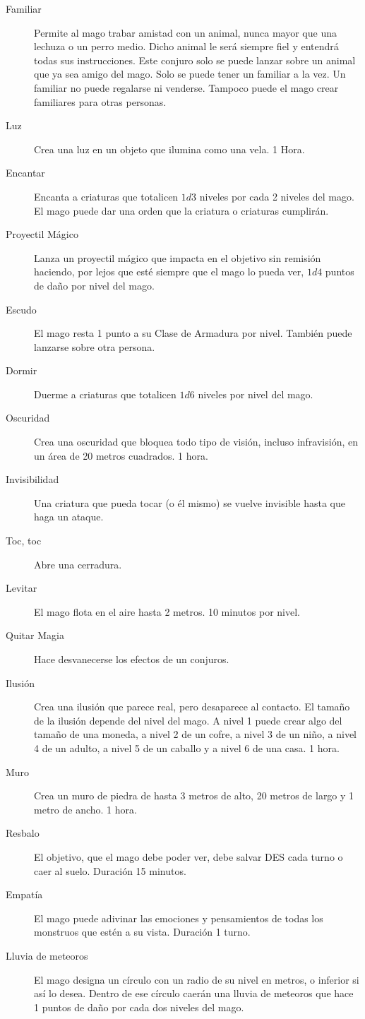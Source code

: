 \begin{multicols}{2}
\begin{description}
\item[Familiar] Permite al mago trabar amistad con un animal, nunca mayor que una lechuza o un perro medio. Dicho animal le será siempre fiel y entendrá todas sus instrucciones. Este conjuro solo se puede lanzar sobre un animal que ya sea amigo del mago. Solo se puede tener un familiar a la vez. Un familiar no puede regalarse ni venderse. Tampoco puede el mago crear familiares para otras personas.
\item[Luz] Crea una luz en un objeto que ilumina como una vela. 1 Hora.
\item[Encantar] Encanta a criaturas que totalicen $1d3$ niveles por cada 2 niveles del mago. El mago puede dar una orden que la criatura o criaturas cumplirán.
\item[Proyectil Mágico] Lanza un proyectil mágico que impacta en el objetivo sin remisión haciendo, por lejos que esté siempre que el mago lo pueda ver, $1d4$ puntos de daño por nivel del mago.
\item[Escudo] El mago resta 1 punto a su Clase de Armadura por nivel. También puede lanzarse sobre otra persona.
\item[Dormir] Duerme a criaturas que totalicen $1d6$ niveles por nivel del mago.
\item[Oscuridad] Crea una oscuridad que bloquea todo tipo de visión, incluso infravisión, en un área de 20 metros cuadrados. 1 hora.
\item[Invisibilidad] Una criatura que pueda tocar (o él mismo) se vuelve invisible hasta que haga un ataque.
\item[Toc, toc] Abre una cerradura.
\item[Levitar] El mago flota en el aire hasta 2 metros. 10 minutos por nivel.
\item[Quitar Magia] Hace desvanecerse los efectos de un conjuros.
\item[Ilusión] Crea una ilusión que parece real, pero desaparece al contacto. El tamaño de la ilusión depende del nivel del mago. A nivel 1 puede crear algo del tamaño de una moneda, a nivel 2 de un cofre, a nivel 3 de un niño, a nivel 4 de un adulto, a nivel 5 de un caballo y a nivel 6 de una casa. 1 hora.
\item[Muro] Crea un muro de piedra de hasta 3 metros de alto, 20 metros de largo y 1 metro de ancho. 1 hora.
\item[Resbalo] El objetivo, que el mago debe poder ver, debe salvar DES cada turno o caer al suelo. Duración 15 minutos.
\item[Empatía] El mago puede adivinar las emociones y pensamientos de todas los monstruos
que estén a su vista. Duración 1 turno.
\item[Lluvia de meteoros] El mago designa un círculo con un radio de su nivel en metros, o inferior si así lo desea. Dentro de ese círculo caerán una lluvia de meteoros que hace 1 puntos de daño por cada dos niveles del mago.
\end{description}


\end{multicols}
